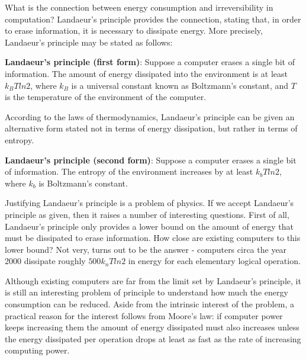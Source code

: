 What is the connection between energy consumption and irreversibility in computation? Landaeur's principle provides the connection, stating that, in order to erase information, it is necessary to dissipate energy. More precisely, Landaeur's principle may be stated as follows:
\begin{definition}
    \textbf{Landaeur's principle (first form)}: Suppose a computer erases a single bit of information. The amount of energy dissipated into the environment is at least $k_BTln 2$, where $k_B$ is a universal constant known as Boltzmann's constant, and $T$ is the temperature of the environment of the computer.
\end{definition}

According to the laws of thermodynamics, Landaeur's principle can be given an alternative form stated not in terms of energy dissipation, but rather in terms of entropy.

\begin{definition}
    \textbf{Landaeur's principle (second form)}: Suppose a computer erases a single bit of information. The entropy of the environment increases by at least $k_b Tln 2$, where $k_b$ is Boltzmann's constant.
\end{definition}

Justifying Landaeur's principle is a problem of physics. If we accept Landaeur's principle as given, then it raises a number of interesting questions. First of all, Landaeur's principle only provides a lower bound on the amount of energy that must be dissipated to erase information. How close are existing computers to this lower bound? Not very, turns out to be the answer - computers circa the year 2000 dissipate roughly $500k_n Tln2$ in energy for each elementary logical operation.

Although existing computers are far from the limit set by Landaeur's principle, it is still an interesting problem of principle to understand how much the energy consumption can be reduced. Aside from the intrinsic interest of the problem, a practical reason for the interest follows from Moore's law: if computer power keeps increasing them the amount of energy dissipated must also increases unless the energy dissipated per operation drops at least as fast as the rate of increasing computing power.

